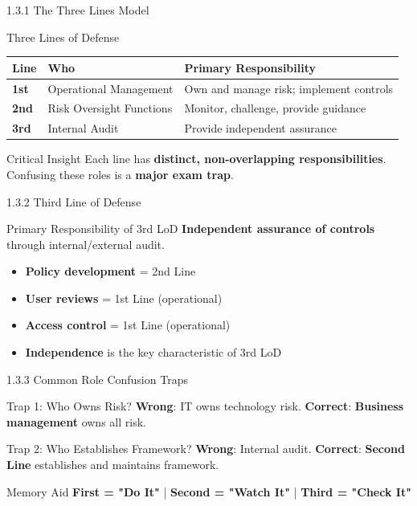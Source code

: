 \documentclass{beamer}
\begin{document}
	\begin{frame}{1.3.1 The Three Lines Model}
		\begin{block}{Three Lines of Defense}
			\begin{tabular}{|p{2cm}|p{4cm}|p{5cm}|}
				\hline
				\textbf{Line} & \textbf{Who} & \textbf{Primary Responsibility} \\
				\hline
				\textbf{1st} & Operational Management & Own and manage risk; implement controls \\
				\hline
				\textbf{2nd} & Risk Oversight Functions & Monitor, challenge, provide guidance \\
				\hline
				\textbf{3rd} & Internal Audit & Provide independent assurance \\
				\hline
			\end{tabular}
		\end{block}
		\begin{alertblock}{Critical Insight}
			Each line has \textbf{distinct, non-overlapping responsibilities}. Confusing these roles is a \textbf{major exam trap}.
		\end{alertblock}
	\end{frame}
	
	\begin{frame}{1.3.2 Third Line of Defense}
		\begin{block}{Primary Responsibility of 3rd LoD}
			\textbf{Independent assurance of controls} through internal/external audit.
		\end{block}
		\begin{itemize}
			\item \textbf{Policy development} = 2nd Line
			\item \textbf{User reviews} = 1st Line (operational)
			\item \textbf{Access control} = 1st Line (operational)
			\item \textbf{Independence} is the key characteristic of 3rd LoD
		\end{itemize}
	\end{frame}
	
	\begin{frame}{1.3.3 Common Role Confusion Traps}
		\begin{block}{Trap 1: Who Owns Risk?}
			\textbf{Wrong}: IT owns technology risk. \quad \textbf{Correct}: \textbf{Business management} owns all risk.
		\end{block}
		\begin{block}{Trap 2: Who Establishes Framework?}
			\textbf{Wrong}: Internal audit. \quad \textbf{Correct}: \textbf{Second Line} establishes and maintains framework.
		\end{block}
		\begin{exampleblock}{Memory Aid}
			\textbf{First = "Do It"} | \textbf{Second = "Watch It"} | \textbf{Third = "Check It"}
		\end{exampleblock}
	\end{frame}
	
\end{document}
